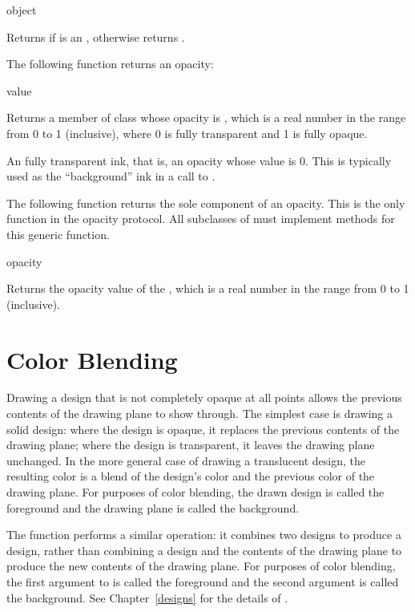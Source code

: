  {object}

Returns  if  is an , otherwise returns
.


The following function returns an opacity:

 {value}

Returns a member of class  whose opacity is , which is a
real number in the range from 0 to 1 (inclusive), where 0 is fully transparent
and 1 is fully opaque.


An fully transparent ink, that is, an opacity whose value is 0.  This is
typically used as the ``background'' ink in a call to .


The following function returns the sole component of an opacity.  This is the
only function in the opacity protocol.  All subclasses of  must
implement methods for this generic function.

 {opacity}

Returns the opacity value of the  , which is a real
number in the range from 0 to 1 (inclusive).


\section {Color Blending}

Drawing a design that is not completely opaque at all points allows the previous
contents of the drawing plane to show through.  The simplest case is drawing a
solid design:  where the design is opaque, it replaces the previous contents of
the drawing plane; where the design is transparent, it leaves the drawing plane
unchanged.  In the more general case of drawing a translucent design, the
resulting color is a blend of the design's color and the previous color of the
drawing plane.  For purposes of color blending, the drawn design is called the
foreground and the drawing plane is called the background.

The function  performs a similar operation: it combines two
designs to produce a design, rather than combining a design and the contents of
the drawing plane to produce the new contents of the drawing plane.  For
purposes of color blending, the first argument to  is called
the foreground and the second argument is called the background.  See
Chapter~\ref{designs} for the details of .


